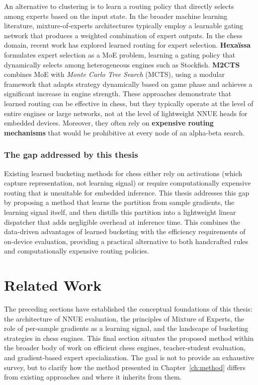 An alternative to clustering is to learn a routing policy that directly selects among experts based on the input state. In the broader machine learning literature, mixture-of-experts architectures typically employ a learnable gating network that produces a weighted combination of expert outputs. In the chess domain, recent work has explored learned routing for expert selection. \textbf{Hexa{\"i}ssa}~\cite{ngo2026hexaissa} formulates expert selection as a MoE problem, learning a gating policy that dynamically selects among heterogeneous engines such as Stockfish. \textbf{M2CTS}~\cite{helfenstein2024m2cts} combines MoE with \emph{Monte Carlo Tree Search} (MCTS), using a modular framework that adapts strategy dynamically based on game phase and achieves a significant increase in engine strength. These approaches demonstrate that learned routing can be effective in chess, but they typically operate at the level of entire engines or large networks, not at the level of lightweight NNUE heads for embedded devices. Moreover, they often rely on \textbf{expensive routing mechanisms} that would be prohibitive at every node of an alpha-beta search.

\subsubsection{The gap addressed by this thesis}\label{sec:gap}

Existing learned bucketing methods for chess either rely on activations (which capture representation, not learning signal) or require computationally expensive routing that is unsuitable for embedded inference. This thesis addresses this gap by proposing a method that learns the partition from sample gradients, the learning signal itself, and then distills this partition into a lightweight linear dispatcher that adds negligible overhead at inference time. This combines the data-driven advantages of learned bucketing with the efficiency requirements of on-device evaluation, providing a practical alternative to both handcrafted rules and computationally expensive routing policies.

\section{Related Work}\label{sec:related-work}

The preceding sections have established the conceptual foundations of this thesis: the architecture of NNUE evaluation, the principles of Mixture of Experts, the role of per-sample gradients as a learning signal, and the landscape of bucketing strategies in chess engines. This final section situates the proposed method within the broader body of work on efficient chess engines, teacher-student evaluation, and gradient-based expert specialization. The goal is not to provide an exhaustive survey, but to clarify how the method presented in Chapter~\ref{ch:method} differs from existing approaches and where it inherits from them.

